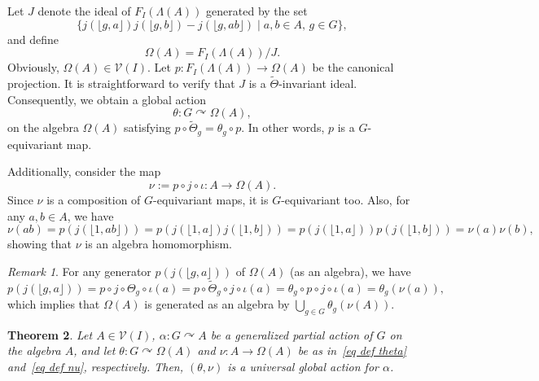 \documentclass[11pt]{amsart}
\numberwithin{equation}{section}
\newtheorem{theorem}{Theorem}[section] %
\theoremstyle{definition}
\theoremstyle{remark}
\newtheorem{remark}[theorem]{Remark}
\begin{document}
Let \(J\) denote the ideal of \(F_I(\Lambda(A))\) generated by the set 
\[
    \{j(\lfloor g, a \rfloor) j(\lfloor g, b \rfloor) - j(\lfloor g, ab \rfloor) \mid a, b \in A, \, g \in G\},
\]
and define 
\begin{equation}\label{eq def omega}
    \Omega(A) = F_I(\Lambda(A)) / J.
\end{equation}
 Obviously, $\Omega(A) \in \mathcal{V}(I) .$
Let \(p: F_I(\Lambda(A)) \to \Omega(A)\) be the canonical projection. It is straightforward to verify that \(J\) is a \(\widetilde{\Theta}\)-invariant ideal. Consequently, we obtain a global action 
\begin{equation}\label{eq def theta}
    \theta: G \curvearrowright \Omega(A),
\end{equation}
 on the algebra $\Omega(A)$ satisfying \(p \circ \widetilde{\Theta}_g = \theta_g \circ p\). In other words, \(p\) is a $G$-equivariant map. 


Additionally, consider the map 
\begin{equation}\label{eq def nu}
    \nu := p \circ j \circ \iota: A \to \Omega(A).
\end{equation}
Since \(\nu\) is a composition of \(G\)-equivariant maps, it is \(G\)-equivariant too. Also, for any \(a, b \in A\), we have 
\[
    \nu(ab) = p(j(\lfloor 1, ab \rfloor)) = p(j(\lfloor 1, a \rfloor) j(\lfloor 1, b \rfloor)) = p(j(\lfloor 1, a \rfloor)) p(j(\lfloor 1, b \rfloor)) = \nu(a) \nu(b),
\]
showing that \(\nu\) is an algebra homomorphism.

\begin{remark}\label{r: generators of Omega A}
    For any generator $p(j(\lfloor g,a\rfloor))$ of $\Omega(A)$ (as an algebra), we have 
    \[
        p(j(\lfloor g,a\rfloor))=p\circ j\circ \Theta_g\circ \iota(a)=p\circ \widetilde\Theta_g\circ j\circ \iota(a)=\theta_g\circ p\circ j\circ \iota(a)=\theta_g(\nu(a)),
    \]
which implies that \(\Omega(A)\) is generated as an algebra by \(\bigcup_{g \in G} \theta_g(\nu(A))\).
       
\end{remark}



\begin{theorem}\label{p: universal global action in varieties}
    Let \( A \in \mathcal{V}(I) \), \(\alpha: G \curvearrowright A\) be a generalized partial action of \(G\) on the algebra \(A\), and let \(\theta: G \curvearrowright \Omega(A)\) and \(\nu: A \to \Omega(A)\) be as in~\eqref{eq def theta} and~\eqref{eq def nu}, respectively. Then, \((\theta, \nu)\) is a universal global action for \(\alpha\).
\end{theorem}
\end{document}

